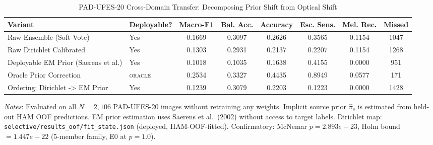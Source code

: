 \begin{table}[t]
\caption{PAD-UFES-20 Cross-Domain Transfer: Decomposing Prior Shift from Optical Shift}
\label{tab:pad_prior_shift}
\centering
\footnotesize
\begin{tabular}{llcccccc}
\toprule
\textbf{Variant} & \textbf{Deployable?} & \textbf{Macro-F1} & \textbf{Bal. Acc.} & \textbf{Accuracy} & \textbf{Esc. Sens.} & \textbf{Mel. Rec.} & \textbf{Missed} \\
\midrule
Raw Ensemble (Soft-Vote) & Yes & 0.1669 & 0.3097 & 0.2626 & 0.3565 & 0.1154 & 1047 \\
Raw Dirichlet Calibrated & Yes & 0.1303 & 0.2931 & 0.2137 & 0.2207 & 0.1154 & 1268 \\
Deployable EM Prior (Saerens et al.) & Yes & 0.1018 & 0.1035 & 0.1638 & 0.4155 & 0.0000 & 951 \\
Oracle Prior Correction & \textsc{oracle} & 0.2534 & 0.3327 & 0.4435 & 0.8949 & 0.0577 & 171 \\
Ordering: Dirichlet -> EM Prior & Yes & 0.1239 & 0.3079 & 0.2203 & 0.1223 & 0.0000 & 1428 \\
\bottomrule
\end{tabular}
\vspace{1mm}
\parbox{\linewidth}{\raggedright \emph{Notes}: Evaluated on all $N=2{,}106$ PAD-UFES-20 images without retraining any weights. Implicit source prior $\hat\pi_s$ is estimated from held-out HAM OOF predictions. EM prior estimation uses Saerens et al.\ (2002) without access to target labels. Dirichlet map: \texttt{selective/results\_oof/fit\_state.json} (deployed, HAM-OOF-fitted). Confirmatory: McNemar $p = 2.893e-23$, Holm bound $= 1.447e-22$ (5-member family, E0 at $p=1.0$).}
\end{table}